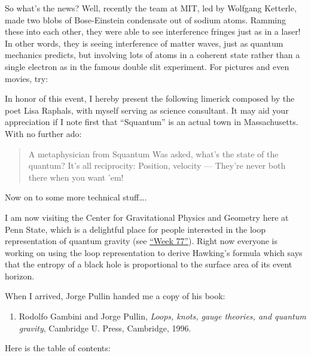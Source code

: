 \documentclass{article}
\def\tightlist{}
\renewcommand{\texttt}[1]{%
  \begingroup
  \ttfamily
  \begingroup\lccode`~=`/\lowercase{\endgroup\def~}{/\discretionary{}{}{}}%
  \begingroup\lccode`~=`[\lowercase{\endgroup\def~}{[\discretionary{}{}{}}%
  \begingroup\lccode`~=`.\lowercase{\endgroup\def~}{.\discretionary{}{}{}}%
  \catcode`/=\active\catcode`[=\active\catcode`.=\active
  \scantokens{#1\noexpand}%
  \endgroup
}
\begin{document}
So what's the news? Well, recently the team at MIT, led by Wolfgang
Ketterle, made two blobs of Bose-Einstein condensate out of sodium
atoms. Ramming these into each other, they were able to see interference
fringes just as in a laser! In other words, they is seeing interference
of matter waves, just as quantum mechanics predicts, but involving lots
of atoms in a coherent state rather than a single electron as in the
famous double slit experiment. For pictures and even movies, try:


In honor of this event, I hereby present the following limerick composed
by the poet Lisa Raphals, with myself serving as science consultant. It
may aid your appreciation if I note first that ``Squantum'' is an actual
town in Massachusetts. With no further ado:

\begin{quote}
A metaphysician from Squantum Was asked, what's the state of the
quantum? It's all reciprocity: Position, velocity --- They're never both
there when you want 'em!
\end{quote}

Now on to some more technical stuff\ldots.

I am now visiting the Center for Gravitational Physics and Geometry here
at Penn State, which is a delightful place for people interested in the
loop representation of quantum gravity (see
\protect\hyperlink{week77}{``Week 77''}). Right now everyone is working
on using the loop representation to derive Hawking's formula which says
that the entropy of a black hole is proportional to the surface area of
its event horizon.

When I arrived, Jorge Pullin handed me a copy of his book:

\begin{enumerate}
\def\labelenumi{\arabic{enumi})}
\setcounter{enumi}{3}
\tightlist
\item
  Rodolfo Gambini and Jorge Pullin, \emph{Loops, knots, gauge theories,
  and quantum gravity}, Cambridge U. Press, Cambridge, 1996.
\end{enumerate}

Here is the table of contents:
\end{document}
